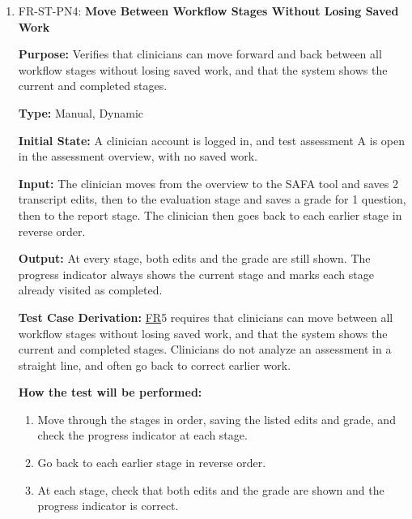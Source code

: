 \documentclass[12pt, titlepage]{article}
\newcommand{\srsfr}[1]{\href{https://github.com/Nour-Fawaz/MacaBoca/blob/main/pdfs/SRS/SRS.pdf}{FR}}
\renewcommand{\_}{\oldunderscore\allowbreak}
\begin{document}
\begin{enumerate}
  \item FR-ST-PN4: \textbf{Move Between Workflow Stages Without Losing Saved Work\\}
  \begin{mdframed}[linewidth=0.5mm]
      \textbf{Purpose:} Verifies that clinicians can move forward and back between all workflow stages without losing saved work, and that the system shows the current and completed stages. \par
      \textbf{Type:} Manual, Dynamic \par
      \textbf{Initial State:} A clinician account is logged in, and test assessment A is open in the assessment overview, with no saved work. \par
      \textbf{Input:} The clinician moves from the overview to the SAFA tool and saves 2 transcript edits, then to the evaluation stage and saves a grade for 1 question, then to the report stage. The clinician then goes back to each earlier stage in reverse order. \par
      \textbf{Output:} At every stage, both edits and the grade are still shown. The progress indicator always shows the current stage and marks each stage already visited as completed. \par
      \textbf{Test Case Derivation:} \srsfr*{5} requires that clinicians can move between all workflow stages without losing saved work, and that the system shows the current and completed stages. Clinicians do not analyze an assessment in a straight line, and often go back to correct earlier work. \par
      \textbf{How the test will be performed:}
      \begin{enumerate}
        \item[1.] Move through the stages in order, saving the listed edits and grade, and check the progress indicator at each stage.
        \item[2.] Go back to each earlier stage in reverse order.
        \item[3.] At each stage, check that both edits and the grade are shown and the progress indicator is correct.
      \end{enumerate}
  \end{mdframed}
\end{enumerate}
\end{document}
